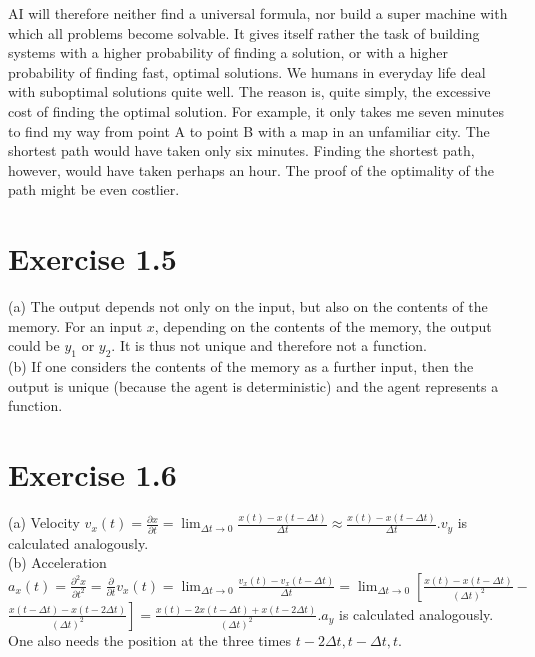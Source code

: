 \documentclass[10pt]{book}
\begin{document}
\begin{center}
\begin{enumerate}
\begin{center}
\begin{center}
\begin{center}
\begin{center}
\begin{center}
AI will therefore neither find a universal formula, nor build a super machine with which all problems become solvable. It gives itself rather the task of building systems with a higher probability of finding a solution, or with a higher probability of finding fast, optimal solutions. We humans in everyday life deal with suboptimal solutions quite well. The reason is, quite simply, the excessive cost of finding the optimal solution. For example, it only takes me seven minutes to find my way from point A to point B with a map in an unfamiliar city. The shortest path would have taken only six minutes. Finding the shortest path, however, would have taken perhaps an hour. The proof of the optimality of the path might be even costlier.

\section*{Exercise 1.5}
(a) The output depends not only on the input, but also on the contents of the memory. For an input $x$, depending on the contents of the memory, the output could be $y_{1}$ or $y_{2}$. It is thus not unique and therefore not a function.\\
(b) If one considers the contents of the memory as a further input, then the output is unique (because the agent is deterministic) and the agent represents a function.

\section*{Exercise 1.6}
(a) Velocity $v_{x}(t)=\frac{\partial x}{\partial t}=\lim _{\Delta t \rightarrow 0} \frac{x(t)-x(t-\Delta t)}{\Delta t} \approx \frac{x(t)-x(t-\Delta t)}{\Delta t} . v_{y}$ is calculated analogously.\\
(b) Acceleration $a_{x}(t)=\frac{\partial^{2} x}{\partial t^{2}}=\frac{\partial}{\partial t} v_{x}(t)=\lim _{\Delta t \rightarrow 0} \frac{v_{x}(t)-v_{x}(t-\Delta t)}{\Delta t}=\lim _{\Delta t \rightarrow 0}\left[\frac{x(t)-x(t-\Delta t)}{(\Delta t)^{2}}-\right.$ $\left.\frac{x(t-\Delta t)-x(t-2 \Delta t)}{(\Delta t)^{2}}\right]=\frac{x(t)-2 x(t-\Delta t)+x(t-2 \Delta t)}{(\Delta t)^{2}} . a_{y}$ is calculated analogously. One also needs the position at the three times $t-2 \Delta t, t-\Delta t, t$.


\end{center}
\end{center}
\end{center}
\end{center}
\end{center}
\end{enumerate}
\end{center}
\end{document}
